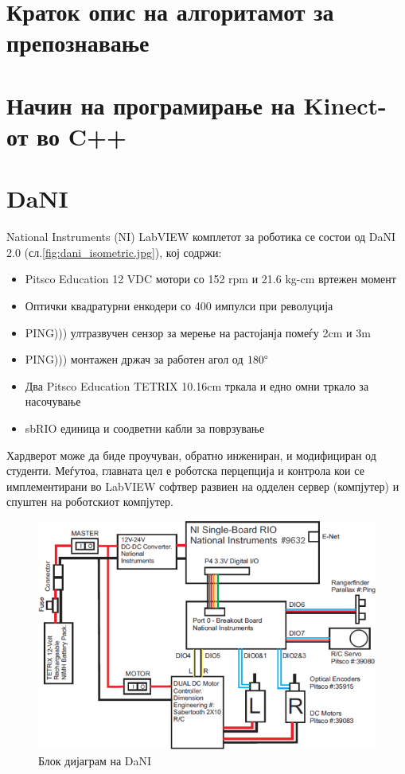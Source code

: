 \documentclass{article}
\begin{document}
\newpage
\section{Краток опис на алгоритамот за препознавање}
\newpage
\section{Начин на програмирање на Kinect-от во C++}
\newpage
\section{DaNI}
National Instruments (NI) LabVIEW комплетот за роботика се состои од DaNI 2.0 (сл.\ref{fig:dani_isometric.jpg}), кој содржи:

\begin{itemize}
	\item Pitsco Education 12 VDC мотори со 152 rpm и 21.6 kg-cm вртежен момент
	\item Оптички квадратурни енкодери со 400 импулси при револуција
	\item PING))) ултразвучен сензор за мерење на растојанја помеѓу 2cm и 3m
	\item PING))) монтажен држач за работен агол од $180 \degree$
	\item Два Pitsco Education TETRIX 10.16cm тркала и едно омни тркало за насочување
	\item sbRIO единица и соодветни кабли за поврзување
\end{itemize}

Хардверот може да биде проучуван, обратно инжениран, и модифициран од студенти. Меѓутоа, главната цел е роботска перцепција и контрола кои се имплементирани во LabVIEW софтвер развиен на одделен сервер (компјутер) и спуштен на роботскиот компјутер.

\begin{figure}[H]
\includegraphics[width=0.75\linewidth]{./images/dani_block_diagram.png}
\centering
\caption{Блок дијаграм на DaNI}
\label{fig:dani_block_diagram.png}
\end{figure}
\end{document}
